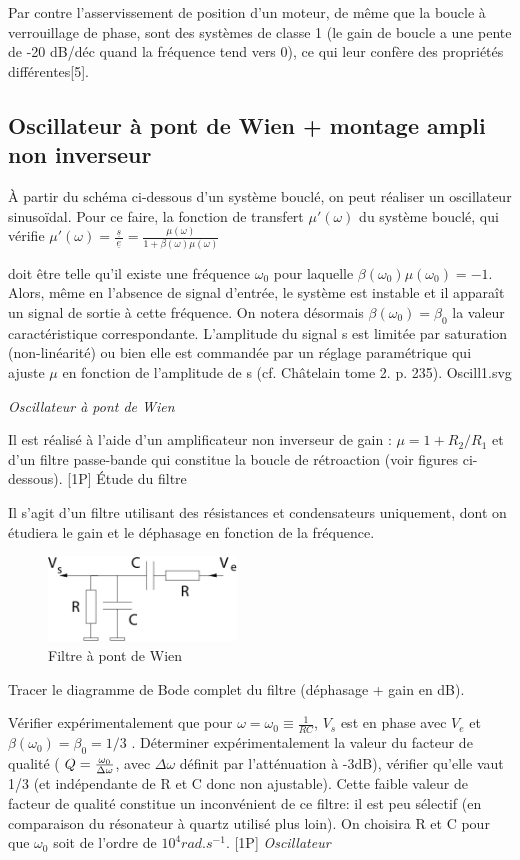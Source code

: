 \documentclass{article}%
\begin{document}
Par contre l'asservissement de position d'un moteur, de même que la boucle à verrouillage de phase, sont des systèmes de classe 1 (le gain de boucle a une pente de -20 dB/déc quand la fréquence tend vers 0), ce qui leur confère des propriétés différentes[5]. 

\subsection{Oscillateur à pont de Wien + montage ampli non inverseur}

À partir du schéma ci-dessous d'un système bouclé, on peut réaliser un oscillateur sinusoïdal. Pour ce faire, la fonction de transfert $\mu' (\omega)$ du système bouclé, qui vérifie
$ \mu' (\omega)=\frac{\,\underline{s}\,}{\underline{e}}= \frac{\mu(\omega) }{1 + \beta (\omega) \mu(\omega) }$

doit être telle qu'il existe une fréquence $\omega_0$ pour laquelle $\beta(\omega_0) \mu(\omega_0) = -1$. Alors, même en l'absence de signal d'entrée, le système est instable et il apparaît un signal de sortie à cette fréquence. On notera désormais $\beta(\omega_0)=\beta_0$ la valeur caractéristique correspondante. L'amplitude du signal s est limitée par saturation (non-linéarité) ou bien elle est commandée par un réglage paramétrique qui ajuste $\mu$ en fonction de l'amplitude de s (cf. Châtelain tome 2. p. 235).
Oscill1.svg

\textit{Oscillateur à pont de Wien}

Il est réalisé à l'aide d'un amplificateur non inverseur de gain : $\mu = 1 + R_2/R_1$ et d'un filtre passe-bande qui constitue la boucle de rétroaction (voir figures ci-dessous).
[1P] Étude du filtre

Il s'agit d'un filtre utilisant des résistances et condensateurs uniquement, dont on étudiera le gain et le déphasage en fonction de la fréquence.
\begin{figure}
	\centerline{\includegraphics[width=5cm]{images-exp/Oscill2.png}}
	\caption{Filtre à pont de Wien}
\end{figure}

Tracer le diagramme de Bode complet du filtre (déphasage + gain en dB).

Vérifier expérimentalement que pour $\omega = \omega_0\equiv \frac{1}{RC}$, $V_s$ est en phase avec $V_e$ et $\beta(\omega_0)=\beta_0=1/3$ . Déterminer expérimentalement la valeur du facteur de qualité ( $Q={\omega_0 \over \Delta\omega}$, avec $\Delta\omega$ définit par l'atténuation à -3dB), vérifier qu'elle vaut 1/3 (et indépendante de R et C donc non ajustable). Cette faible valeur de facteur de qualité constitue un inconvénient de ce filtre: il est peu sélectif (en comparaison du résonateur à quartz utilisé plus loin). On choisira R et C pour que $\omega_{0}$ soit de l'ordre de $10^{4} rad.s ^{-1}$.
[1P] \textit{Oscillateur}
\end{document}

